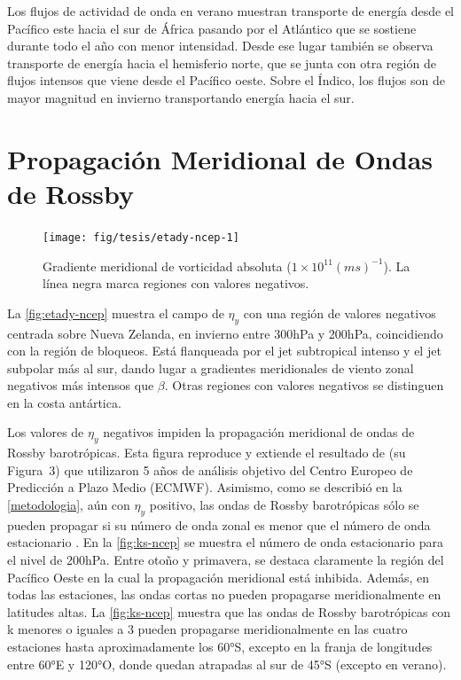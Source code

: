 \documentclass[spanish,a4paper,12pt,oneside]{book}
\begin{document}
Los flujos de actividad de onda en verano muestran transporte de energía
desde el Pacífico este hacia el sur de África pasando por el Atlántico
que se sostiene durante todo el año con menor intensidad. Desde ese
lugar también se observa transporte de energía hacia el hemisferio
norte, que se junta con otra región de flujos intensos que viene desde
el Pacífico oeste. Sobre el Índico, los flujos son de mayor magnitud en
invierno transportando energía hacia el sur.

\section{Propagación Meridional de Ondas de
Rossby}\label{propagacion-meridional-de-ondas-de-rossby}

\begin{landscape}\begin{figure}

{\centering \texttt{[image: fig/tesis/etady-ncep-1]} 

}

\caption{Gradiente meridional de vorticidad absoluta ($1\times10^11(ms)^{-1}$). La línea negra marca regiones con valores negativos.}\label{fig:etady-ncep}
\end{figure}
\end{landscape}

La \autoref{fig:etady-ncep} muestra el campo de \(\eta_y\) con una
región de valores negativos centrada sobre Nueva Zelanda, en invierno
entre 300hPa y 200hPa, coincidiendo con la región de bloqueos. Está
flanqueada por el jet subtropical intenso y el jet subpolar más al sur,
dando lugar a gradientes meridionales de viento zonal negativos más
intensos que \(\beta\). Otras regiones con valores negativos se
distinguen en la costa antártica.

Los valores de \(\eta_{y}\) negativos impiden la propagación meridional
de ondas de Rossby barotrópicas. Esta figura reproduce y extiende el
resultado de \citet{Berbery1992} (su Figura~3) que utilizaron 5 años de
análisis objetivo del Centro Europeo de Predicción a Plazo Medio
(ECMWF). Asimismo, como se describió en la \autoref{metodologia}, aún
con \(\eta_{y}\) positivo, las ondas de Rossby barotrópicas sólo se
pueden propagar si su número de onda zonal es menor que el número de
onda estacionario \citep{James}. En la \autoref{fig:ks-ncep} se muestra
el número de onda estacionario para el nivel de 200hPa. Entre otoño y
primavera, se destaca claramente la región del Pacífico Oeste en la cual
la propagación meridional está inhibida. Además, en todas las
estaciones, las ondas cortas no pueden propagarse meridionalmente en
latitudes altas. La \autoref{fig:ks-ncep} muestra que las ondas de
Rossby barotrópicas con k menores o iguales a 3 pueden propagarse
meridionalmente en las cuatro estaciones hasta aproximadamente los 60°S,
excepto en la franja de longitudes entre 60°E y 120°O, donde quedan
atrapadas al sur de 45°S (excepto en verano).
\end{document}
